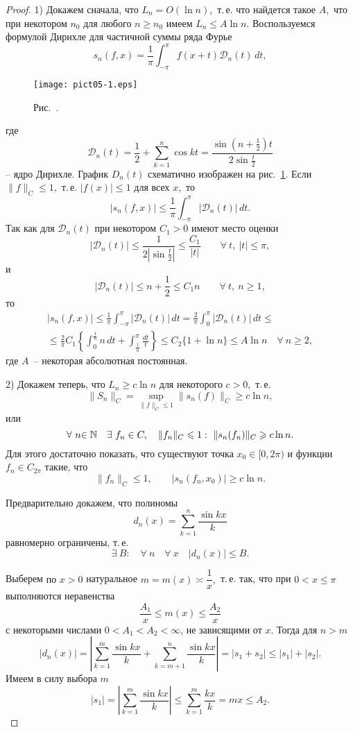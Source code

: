 \begin{proof}
1) Докажем сначала, что $L_n=O(\ln n),$ т.\,е. что найдется такое $A,$ что при некотором
$n_0$ для любого $n\ge n_0$ имеем $L_n\le A\ln n.$ Воспользуемся формулой Дирихле для
частичной суммы ряда Фурье
$$
s_n(f,x)=\frac{1}{\pi}\int_{-\pi}^{\pi} f(x+t) \mathcal D_n(t)\, dt,
$$
\begin{figure}[ht]
\begin{center}
\texttt{[image: pict05-1.eps]}
\end{center}
 \bigskip
 \label{r5-1}

 \centerline{Рис.~\theris. }
 \bigskip
\end{figure}
где
$$
\mathcal D_n(t)=\frac12+\sum\limits_{k=1}^n \cos kt=\frac{\sin\left( n+\frac12
\right)t}{2\sin \frac{t}{2}}
$$
-- ядро Дирихле. График $D_n(t)$ схематично изображен на рис.~\ref{r5-1}. Если $\|f\|_C\le 1,$ т.\,е. $|f(x)|\le 1$ для
всех $x,$ то
$$
|s_n(f,x)|\le \frac{1}{\pi} \int_{-\pi}^{\pi} |\mathcal D_n(t)|\, dt.
$$
Так как для $\mathcal D_n(t)$ при некотором {$C_1>0$} имеют
место оценки
$$
|\mathcal D_n(t)|\le \frac{1}{2\left|\sin \frac{t}{2}\right|}\le \frac{C_{{1}}}{|t|}
\qquad \forall\ t,~ |t|\le \pi,
$$
и
$$
|\mathcal D_n(t)|\le n+\frac{1}{2} \le C_{{1}}n\qquad \forall\ t{,~ n\ge1},
$$
то
\begin{multline*}
|s_n(f,x)|\le \frac{1}{\pi} \int_{-\pi}^{\pi} |\mathcal
D_n(t)|\, dt
{=\frac{2}{\pi}\int_{0}^{\pi} |\mathcal D_n(t)|\,dt}\le \\
\le {\frac{2}{\pi}C_1}\left\{ \int_{0}^{\frac{1}{n}} n\, dt +
\int_{\frac{1}{n}}^{\pi} \frac{dt}{t}\right\}\le C_2\{ 1+\ln n\}\le {A} \ln n\quad
\forall\ n\ge {2},
\end{multline*}
где $A$~-- некоторая абсолютная постоянная.

2) Докажем теперь, что $L_n\ge c\ln n$ для некоторого $c>0,$
т.\,е.
$$
\|{S}_n\|_C=\sup_{\|f\|_C\le 1} \|s_n(f)\|_C\ge c\ln n,
$$
или
$$
\forall\ n{\in\mathbb{N}}\quad \exists\ f_n\in C,\quad \|f_n\|_C\leqslant 1:\ \|s_n(f_n)\|_C\geqslant c\ln n.
$$
Для этого достаточно показать, что существуют точка $x_0\in [0, 2\pi)$ и функции {$f_n \in C_{2\pi}$}
 такие, что
$$
\|f_n\|_C\le 1,\qquad |s_n(f_n,x_0)|\ge c\ln n.
$$

Предварительно докажем, что полиномы
$$
d_n(x)=\sum\limits_{k=1}^n \frac{\sin kx}{k}
$$
равномерно ограничены, т.\,е.
$$
\exists\ {B}:\quad \forall\ n\quad \forall\ x\quad |d_n(x)|\le {B}.
$$

Выберем {по $x>0$} натуральное $m=m(x)\asymp \dfrac{1}{x},$ т.\,е. так, что
при $0< x\le \pi$ выполняются неравенства
$$
\frac{A_1}{x}\le m(x)\le\frac{A_2}{x}
$$
с некоторыми числами $0<A_1<A_2<\infty$, не зависящими от $x$.  Тогда для $n>m$
$$
|d_n(x)|=\left| \sum\limits_{k=1}^m \frac{\sin kx}{k}+
\sum\limits_{k=m+1}^n \frac{\sin kx}{k}\right|=|s_1+s_2|\le |s_1|+|s_2|.
$$
Имеем в силу выбора $m$
$$
|s_1|=\left| \sum\limits_{k=1}^m \frac{\sin kx}{k} \right|\le \sum\limits_{k=1}^m
\frac{kx}{k}=mx\le {A_2}.
$$



\end{proof}
